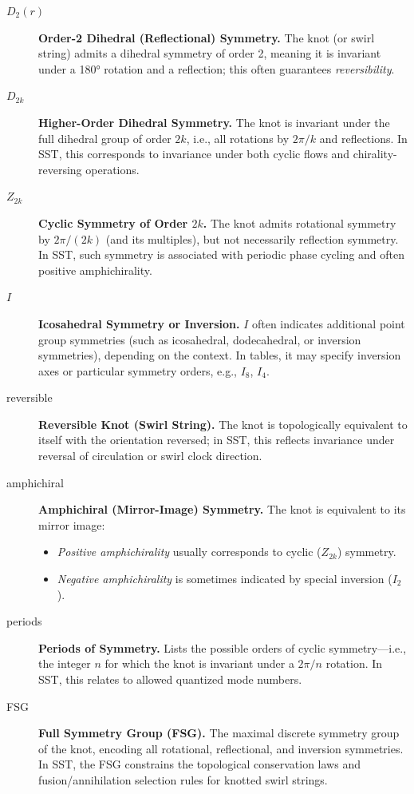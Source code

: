         \begin{description}
            \item[\( D_2(r) \)] \textbf{Order-2 Dihedral (Reflectional) Symmetry.}
            The knot (or swirl string) admits a dihedral symmetry of order 2, meaning it is invariant under a 180° rotation and a reflection; this often guarantees \emph{reversibility}.

            \item[\( D_{2k} \)] \textbf{Higher-Order Dihedral Symmetry.}
            The knot is invariant under the full dihedral group of order \( 2k \), i.e., all rotations by \( 2\pi/k \) and reflections. In SST, this corresponds to invariance under both cyclic flows and chirality-reversing operations.

            \item[\( Z_{2k} \)] \textbf{Cyclic Symmetry of Order \( 2k \).}
            The knot admits rotational symmetry by \( 2\pi/(2k) \) (and its multiples), but not necessarily reflection symmetry. In SST, such symmetry is associated with periodic phase cycling and often positive amphichirality.

            \item[\( I \)] \textbf{Icosahedral Symmetry or Inversion.}
            \( I \) often indicates additional point group symmetries (such as icosahedral, dodecahedral, or inversion symmetries), depending on the context. In tables, it may specify inversion axes or particular symmetry orders, e.g., \( I_8 \), \( I_4 \).

            \item[reversible] \textbf{Reversible Knot (Swirl String).}
            The knot is topologically equivalent to itself with the orientation reversed; in SST, this reflects invariance under reversal of circulation or swirl clock direction.

            \item[amphichiral] \textbf{Amphichiral (Mirror-Image) Symmetry.}
            The knot is equivalent to its mirror image:
            \begin{itemize}\item \emph{Positive amphichirality} usually corresponds to cyclic (\( Z_{2k} \)) symmetry.
            \item \emph{Negative amphichirality} is sometimes indicated by special inversion (\( I_2 \)).
            \end{itemize}

            \item[periods] \textbf{Periods of Symmetry.}
            Lists the possible orders of cyclic symmetry—i.e., the integer \( n \) for which the knot is invariant under a \( 2\pi/n \) rotation. In SST, this relates to allowed quantized mode numbers.

            \item[FSG] \textbf{Full Symmetry Group (FSG).}
            The maximal discrete symmetry group of the knot, encoding all rotational, reflectional, and inversion symmetries. In SST, the FSG constrains the topological conservation laws and fusion/annihilation selection rules for knotted swirl strings.
        \end{description}


